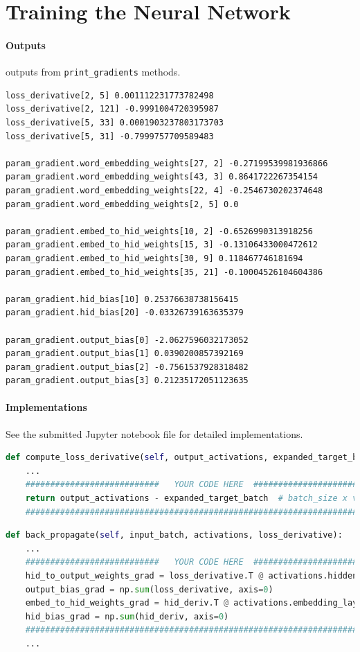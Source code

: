 \documentclass{article}
\begin{document}
    \section{Training the Neural Network}
    \paragraph{Outputs} outputs from \texttt{print\_gradients} methods.
    \begin{lstlisting}
loss_derivative[2, 5] 0.001112231773782498
loss_derivative[2, 121] -0.9991004720395987
loss_derivative[5, 33] 0.0001903237803173703
loss_derivative[5, 31] -0.7999757709589483

param_gradient.word_embedding_weights[27, 2] -0.27199539981936866
param_gradient.word_embedding_weights[43, 3] 0.8641722267354154
param_gradient.word_embedding_weights[22, 4] -0.2546730202374648
param_gradient.word_embedding_weights[2, 5] 0.0

param_gradient.embed_to_hid_weights[10, 2] -0.6526990313918256
param_gradient.embed_to_hid_weights[15, 3] -0.13106433000472612
param_gradient.embed_to_hid_weights[30, 9] 0.118467746181694
param_gradient.embed_to_hid_weights[35, 21] -0.10004526104604386

param_gradient.hid_bias[10] 0.25376638738156415
param_gradient.hid_bias[20] -0.03326739163635379

param_gradient.output_bias[0] -2.0627596032173052
param_gradient.output_bias[1] 0.0390200857392169
param_gradient.output_bias[2] -0.7561537928318482
param_gradient.output_bias[3] 0.21235172051123635
    \end{lstlisting}
    \paragraph{Implementations} See the submitted Jupyter notebook file for detailed implementations.
    \begin{lstlisting}[language=Python]
def compute_loss_derivative(self, output_activations, expanded_target_batch):
	...
    ###########################   YOUR CODE HERE  ##############################
    return output_activations - expanded_target_batch  # batch_size x vocab_size
    ############################################################################
    \end{lstlisting}
    \begin{lstlisting}[language=Python]
def back_propagate(self, input_batch, activations, loss_derivative):
	...
	###########################   YOUR CODE HERE  ##############################
	hid_to_output_weights_grad = loss_derivative.T @ activations.hidden_layer
	output_bias_grad = np.sum(loss_derivative, axis=0)
	embed_to_hid_weights_grad = hid_deriv.T @ activations.embedding_layer
	hid_bias_grad = np.sum(hid_deriv, axis=0)
	############################################################################
	...
    \end{lstlisting}
    
\end{document}
